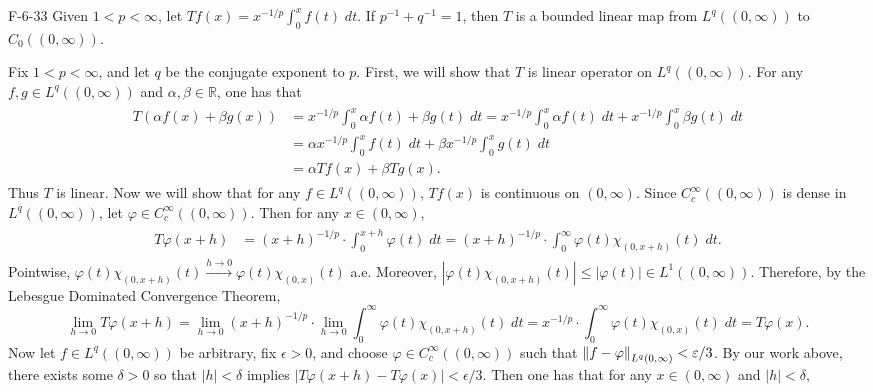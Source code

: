 \documentclass{article}
\begin{document}
	\begin{prb}{F-6-33}
		Given $1 < p < \infty$, let $Tf(x) = x^{-1/p}\int_{0}^{x}f(t)\;dt$. If $p^{-1} + q^{-1} = 1$, then $T$ is a bounded linear map from $L^{q}((0,\infty))$ to $C_{0}((0, \infty))$. 
	\end{prb}
	Fix $1 < p < \infty$, and let $q$ be the conjugate exponent to $p$. First, we will show that $T$ is linear operator on $L^{q}((0,\infty))$. For any $f, g \in L^{q}((0,\infty))$ and $\alpha, \beta \in \mathbb{R}$, one has that 
	\begin{align*}
		\begin{split}
			T(\alpha f(x) + \beta g(x)) &= x^{-1/p}\int_{0}^{x}\alpha f(t) + \beta g(t)\;dt = x^{-1/p}\int_{0}^{x}\alpha f(t)\;dt + x^{-1/p}\int_{0}^{x}\beta g(t)\;dt \\
			&= \alpha x^{-1/p}\int_{0}^{x}f(t)\;dt + \beta x^{-1/p}\int_{0}^{x}g(t)\;dt \\
			&= \alpha Tf(x) + \beta Tg(x). 
		\end{split}
	\end{align*}
	Thus $T$ is linear. Now we will show that for any $f \in L^{q}((0,\infty))$, $Tf(x)$ is continuous on $(0,\infty)$. Since $C_{c}^{\infty}((0,\infty))$ is dense in $L^{q}((0,\infty))$, let $\varphi \in C_{c}^{\infty}((0,\infty))$. Then for any $x \in (0, \infty)$, 
	\begin{align*}
		\begin{split}
			T\varphi(x + h) &= (x + h)^{-1/p} \cdot \int_{0}^{x + h}\varphi(t)\;dt = (x + h)^{-1/p} \cdot \int_{0}^{\infty}\varphi(t)\chi_{(0, x + h)}(t)\;dt.
		\end{split}
	\end{align*}
	Pointwise, $\varphi(t) \chi_{(0, x + h)}(t) \xrightarrow{h \to 0} \varphi(t)\chi_{(0,x)}(t)$ a.e. Moreover, $|\varphi(t)\chi_{(0, x + h)}(t)| \leq |\varphi(t)| \in L^{1}((0,\infty))$. Therefore, by the Lebesgue Dominated Convergence Theorem, 
	\begin{equation*}
		\lim_{h \to 0}T\varphi(x + h) = \lim_{h \to 0}(x + h)^{-1/p} \cdot \lim_{h \to 0}\int_{0}^{\infty}\varphi(t)\chi_{(0, x +  h)}(t)\;dt = x^{-1/p} \cdot \int_{0}^{\infty}\varphi(t)\chi_{(0,x)}(t)\;dt = T\varphi(x). 
	\end{equation*}
	Now let $f \in L^{q}((0, \infty))$ be arbitrary, fix $\epsilon > 0$, and choose $\varphi \in C_{c}^{\infty}((0,\infty))$ such that $\left\Vert f - \varphi \right\Vert_{L^{q}(0, \infty)} < \varepsilon/3$. By our work above, there exists some $\delta > 0$ so that $|h| < \delta$ implies $|T\varphi(x + h) - T\varphi(x)|< \epsilon/3$. Then one has that for any $x \in (0, \infty)$ and $|h| < \delta$,  
\end{document}
